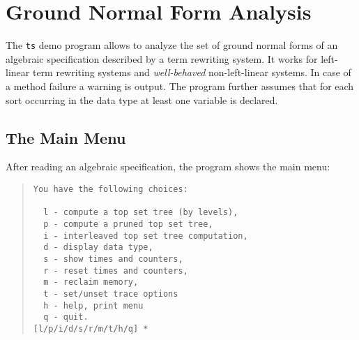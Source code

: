 \section{Ground Normal Form Analysis}
The {\tt ts} demo program allows to analyze the set of ground normal 
forms of an algebraic specification described by a term rewriting system.
It works for left-linear term rewriting systems and
{\em well-behaved} non-left-linear systems.
In case of a method failure a warning is output.
The program further assumes that for each sort occurring in the data
type at least one variable is declared.

\subsection{The Main Menu}
After reading an algebraic specification, the program shows the main
menu:

\begin{quote}
\begin{verbatim}
You have the following choices: 
 
  l - compute a top set tree (by levels),
  p - compute a pruned top set tree,
  i - interleaved top set tree computation,
  d - display data type,
  s - show times and counters,
  r - reset times and counters,
  m - reclaim memory,
  t - set/unset trace options
  h - help, print menu
  q - quit.
[l/p/i/d/s/r/m/t/h/q] *
\end{verbatim}
\end{quote}

